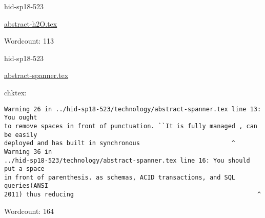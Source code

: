 

\begin{IU}

hid-sp18-523

\href{https://github.com/cloudmesh-community/hid-sp18-523/blob/master//technology/abstract-h2O.tex}{abstract-h2O.tex}

 

Wordcount: 113

\end{IU}



\begin{IU}

hid-sp18-523

\href{https://github.com/cloudmesh-community/hid-sp18-523/blob/master//technology/abstract-spanner.tex}{abstract-spanner.tex}

 
chktex:
\begin{tiny}
\begin{verbatim}
Warning 26 in ../hid-sp18-523/technology/abstract-spanner.tex line 13: You ought
to remove spaces in front of punctuation. ``It is fully managed , can be easily
deployed and has built in synchronous                         ^ Warning 36 in
../hid-sp18-523/technology/abstract-spanner.tex line 16: You should put a space
in front of parenthesis. as schemas, ACID transactions, and SQL queries(ANSI
2011) thus reducing                                                  ^
\end{verbatim}
\end{tiny}

Wordcount: 164

\end{IU}




